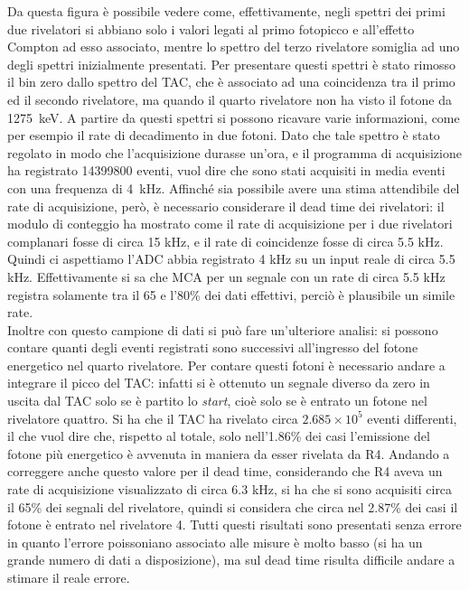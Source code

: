 Da questa figura è possibile vedere come, effettivamente, negli spettri dei primi due rivelatori si abbiano solo i valori legati al primo fotopicco e all'effetto Compton ad
esso associato, mentre lo spettro del terzo rivelatore somiglia ad uno degli spettri inizialmente presentati. Per presentare questi spettri è stato rimosso il bin zero
dallo spettro del TAC, che è associato ad una coincidenza tra il primo ed il secondo rivelatore, ma quando il quarto rivelatore non ha visto il fotone da 1275~keV. A partire
da questi spettri si possono ricavare varie informazioni, come per esempio il rate di decadimento in due fotoni. Dato che tale spettro è stato regolato in modo che
l'acquisizione durasse un'ora, e il programma di acquisizione ha registrato 14399800 eventi, vuol dire che sono stati acquisiti in media eventi con una frequenza di 4~kHz.
Affinché sia possibile avere una stima attendibile del rate di acquisizione, però, è necessario considerare il dead time dei rivelatori: il modulo di conteggio ha mostrato
come il rate di acquisizione per i due rivelatori complanari fosse di circa 15 kHz, e il rate di coincidenze fosse di circa 5.5 kHz. Quindi ci aspettiamo l'ADC abbia
registrato 4 kHz su un input reale di circa 5.5 kHz. Effettivamente si sa che MCA per un segnale con un rate di circa 5.5 kHz registra solamente tra il 65 e l'80\% dei dati
effettivi, perciò è plausibile un simile rate.\\

Inoltre con questo campione di dati si può fare un'ulteriore analisi: si possono contare quanti degli eventi registrati sono successivi all'ingresso del fotone energetico
nel quarto rivelatore. Per contare questi fotoni è necessario andare a integrare il picco del TAC: infatti si è ottenuto un segnale diverso da zero in uscita dal TAC solo
se è partito lo \textit{start}, cioè solo se è entrato un fotone nel rivelatore quattro. Si ha che il TAC ha rivelato circa $2.685 \times 10^5$ eventi differenti, il che vuol
dire che, rispetto al totale, solo nell'1.86\% dei casi l'emissione del fotone più energetico è avvenuta in maniera da esser rivelata da R4. Andando a correggere anche questo
valore per il dead time, considerando che R4 aveva un rate di acquisizione visualizzato di circa 6.3 kHz, si ha che si sono acquisiti circa il 65\% dei segnali del rivelatore,
quindi si considera che circa nel 2.87\% dei casi il fotone è entrato nel rivelatore 4. Tutti questi risultati sono presentati senza errore in quanto l'errore poissoniano
associato alle misure è molto basso (si ha un grande numero di dati a disposizione), ma sul dead time risulta difficile andare a stimare il reale errore.\\


